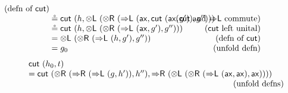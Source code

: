 \documentclass[a4paper,UKenglish,cleveref,autoref,thm-restate, anonymous]{lipics-v2021}
\newcommand{\Rarr}{\Rightarrow}
\newcommand{\mf}[1]{\mathsf{#1}}
\newcommand{\ax}{\mathsf{ax}}
\newcommand{\tl}{{\otimes}\mathsf{L}}
\newcommand{\tr}{{\otimes}\mathsf{R}}
\newcommand{\Rl}{{\Rarr}\mathsf{L}}
\newcommand{\Rr}{{\Rarr}\mathsf{R}}
\newcommand{\cut}{\mf{cut}}
\begin{document}
\begin{example}[continued]
\[\begin{array}{lr}
     \hspace*{-2cm}\text{(defn of $\cut$)}
    \\
    \circeq \cut \ (h , \tl \ (\tr \ (\Rl \ (\ax , \cut \ (\ax , g')) , g''))) &
     \hspace*{-2cm}\text{($\cut$ and $\Rl$ commute)}
    \\
    \circeq \cut \ (h , \tl \ (\tr \ (\Rl \ (\ax , g') , g''))) &
     \hspace*{-2cm}\text{($\cut$ left unital)}
    \\
    = \tl \ (\tr \ (\Rl \ (h , g'), g'')) &
     \hspace*{-2cm}\text{(defn of $\cut$)}
    \\
    = g_0 &
    \hspace*{-0.5cm}\text{(unfold defn)}
  \end{array}
\]
\[
\begin{array}{lr}
  \cut \ (h_0,t) &
  \\
  = \cut \ (\tr \ (\Rr \ (\Rl \ (g , h')) , h'') , \Rr \ (\tl \ (\tr \ (\Rl \ (\ax , \ax) , \ax)))) &
  \\ & \hspace*{-2cm}\text{(unfold defns)}

\end{array}\]
\end{example}
\end{document}
